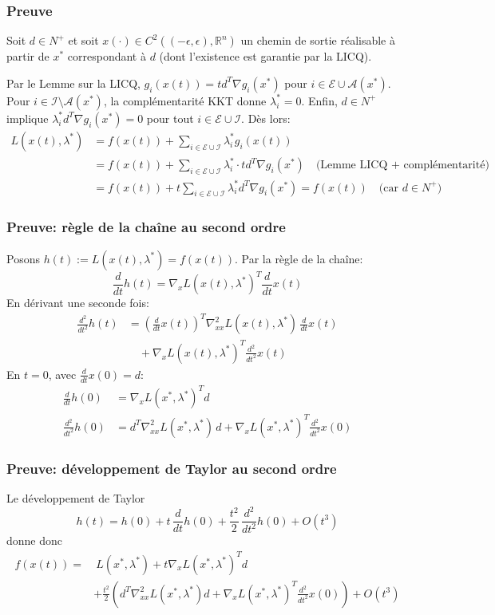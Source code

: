 \documentclass[usepdftitle=false,aspectratio=169]{beamer}
\def\cA{\mathcal{A}}
\def\cE{\mathcal{E}}
\def\cI{\mathcal{I}}
\def\RR{\mathbb{R}}
\begin{document}
\begin{frame}
\frametitle{Preuve}

Soit $d \in N^+$ et soit $x(\cdot) \in C^2((-\epsilon, \epsilon), \RR^n)$ un chemin de sortie réalisable à partir de $x^*$ correspondant à $d$ (dont l'existence est garantie par la LICQ).

Par le Lemme sur la LICQ, $g_i(x(t)) = t d^T \nabla g_i(x^*)$ pour $i \in \cE \cup \cA(x^*)$. Pour $i \in \cI \setminus \cA(x^*)$, la complémentarité KKT donne $\lambda_i^* = 0$. Enfin, $d \in N^+$ implique $\lambda_i^* d^T \nabla g_i(x^*) = 0$ pour tout $i \in \cE \cup \cI$. Dès lors:
\begin{align*}
L(x(t), \lambda^*) &= f(x(t)) + \sum_{i \in \cE \cup \cI} \lambda_i^* g_i(x(t))\\
&= f(x(t)) + \sum_{i \in \cE \cup \cI} \lambda_i^* \cdot t d^T \nabla g_i(x^*)
  \quad \text{(Lemme LICQ + complémentarité)}\\
&= f(x(t)) + t \sum_{i \in \cE \cup \cI} \lambda_i^* d^T \nabla g_i(x^*)
  = f(x(t))
  \quad \text{(car $d \in N^+$)}
\end{align*}

\end{frame}

\begin{frame}
\frametitle{Preuve: règle de la chaîne au second ordre}

Posons $h(t) := L(x(t), \lambda^*) = f(x(t))$. Par la règle de la chaîne:
$$
\frac{d}{dt}h(t) = \nabla_x L(x(t), \lambda^*)^T \frac{d}{dt}x(t)
$$
En dérivant une seconde fois:
\begin{align*}
\frac{d^2}{dt^2}h(t) &= \left(\frac{d}{dt}x(t)\right)^T \nabla_{xx}^2 L(x(t), \lambda^*)\, \frac{d}{dt}x(t) \\
&\quad + \nabla_x L(x(t), \lambda^*)^T \frac{d^2}{dt^2}x(t)
\end{align*}
En $t = 0$, avec $\frac{d}{dt}x(0) = d$:
\begin{align*}
\frac{d}{dt}h(0) &= \nabla_x L(x^*, \lambda^*)^T d \\
\frac{d^2}{dt^2}h(0) &= d^T \nabla_{xx}^2 L(x^*, \lambda^*)\, d + \nabla_x L(x^*, \lambda^*)^T \frac{d^2}{dt^2}x(0)
\end{align*}

\end{frame}

\begin{frame}
\frametitle{Preuve: développement de Taylor au second ordre}

Le développement de Taylor
$$
h(t) = h(0) + t\, \frac{d}{dt}h(0) + \frac{t^2}{2}\, \frac{d^2}{dt^2}h(0) + O(t^3)
$$
donne donc
\begin{align*}
f(x(t)) = &\ L(x^*, \lambda^*) + t \nabla_x L(x^*, \lambda^*)^T d \\
& + \frac{t^2}{2}\!\left( d^T \nabla_{xx}^2 L(x^*, \lambda^*) d
  + \nabla_x L(x^*, \lambda^*)^T \frac{d^2}{dt^2}x(0) \right)
  + O(t^3)
\end{align*}

\end{frame}
\end{document}
